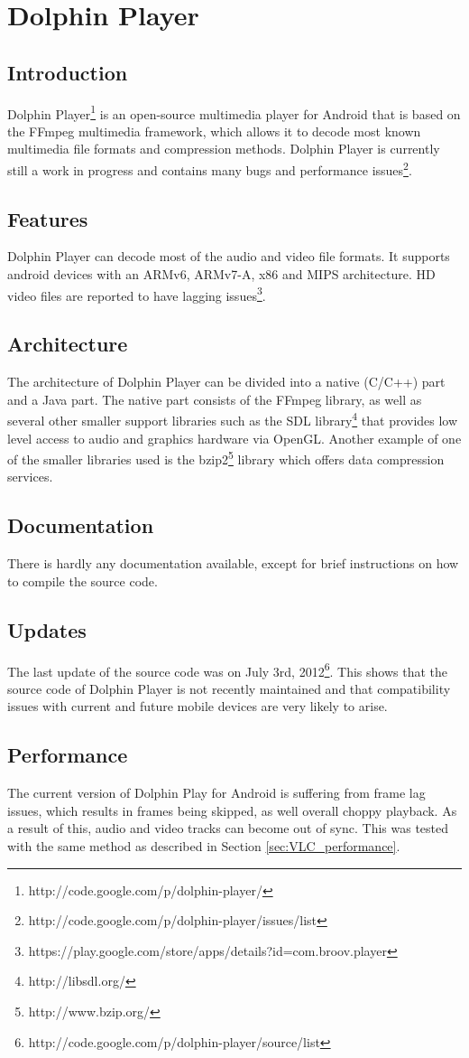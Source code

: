 \section{Dolphin Player}
\subsection{Introduction}
Dolphin Player\footnote{http://code.google.com/p/dolphin-player/} is an open-source multimedia player for Android that is based on the FFmpeg multimedia framework, which allows it to decode most known multimedia file formats and compression methods. Dolphin Player is currently still a work in progress and contains many bugs and performance issues\footnote{http://code.google.com/p/dolphin-player/issues/list}.
\subsection{Features}
Dolphin Player can decode most of the audio and video file formats. It supports android devices with an ARMv6, ARMv7-A, x86 and MIPS architecture. HD video files are reported to have lagging issues\footnote{https://play.google.com/store/apps/details?id=com.broov.player}.
\subsection{Architecture}
The architecture of Dolphin Player can be divided into a native (C/C++) part and a Java part. The native part consists of the FFmpeg library, as well as several other smaller support libraries such as the SDL library\footnote{http://libsdl.org/} that provides low level access to audio and graphics hardware via OpenGL. Another example of one of the smaller libraries used is the bzip2\footnote{http://www.bzip.org/} library which offers data compression services.
\subsection{Documentation}
There is hardly any documentation available, except for brief instructions on how to compile the source code.
\subsection{Updates}
The last update of the source code was on July 3rd, 2012\footnote{http://code.google.com/p/dolphin-player/source/list}. This shows that the source code of Dolphin Player is not recently maintained and that compatibility issues with current and future mobile devices are very likely to arise.
\subsection{Performance}
The current version of Dolphin Play for Android is suffering from frame lag issues, which results in frames being skipped, as well overall choppy playback. As a result of this, audio and video tracks can become out of sync. This was tested with the same method as described in Section \ref{sec:VLC_performance}.


